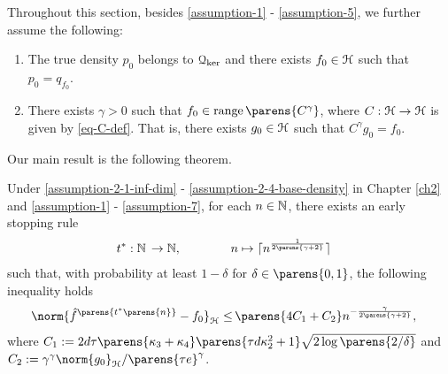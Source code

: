 Throughout this section, besides \ref{assumption-1} - \ref{assumption-5}, we further assume the following: 
\begin{enumerate}[label=\textbf{(B\arabic*)}, resume=assumptions]
	\item \label{assumption-6} The true density $p_0$ belongs to $\mathcal{Q}_{\ker}$ and there exists $f_0 \in \mathcal{H}$ such that $p_0 = q_{f_0}$. %
	\item \label{assumption-7} There exists $\gamma > 0$ such that $f_0 \in \range \parens{C^\gamma}$, where $C: \mathcal{H} \to \mathcal{H}$ is given by \eqref{eq-C-def}. That is, there exists $g_0 \in \mathcal{H}$ such that $C^{\gamma} g_0 = f_0$. 
\end{enumerate}

Our main result is the following theorem. 

\begin{theorem}\label{theorem-convergence-rate}
	Under \ref{assumption-2-1-inf-dim} - \ref{assumption-2-4-base-density} in Chapter \ref{ch2} and \ref{assumption-1} - \ref{assumption-7}, for each $n \in \mathbb{N}$, there exists an early stopping rule 
	\begin{align*}
		t^*: \Natural & \, \to \Natural, \qquad \qquad n \mapsto \ceil{n^{\frac{1}{2 \parens{\gamma + 2}}}}
	\end{align*}
	such that, with probability at least $1 - \delta$ for $\delta \in \parens{0, 1}$, the following inequality holds 
	\begin{align*}
		\norm{\hat{f}^{\parens{t^* \parens{n}}} - f_0}_{\calH} \le & \, \parens{4 C_1 + C_2} n^{-\frac{\gamma}{2 \parens{\gamma+2}}}, 
	\end{align*}
	where $C_1 := 2d\tau \parens{\kappa_3 + \kappa_4} \parens{\tau d \kappa_2^2 + 1} \sqrt{2 \log \parens{2 / \delta}}$ and $C_2 := \gamma^{\gamma} \norm{g_0}_{\calH} / \parens{\tau e}^{\gamma}$. 
\end{theorem}

